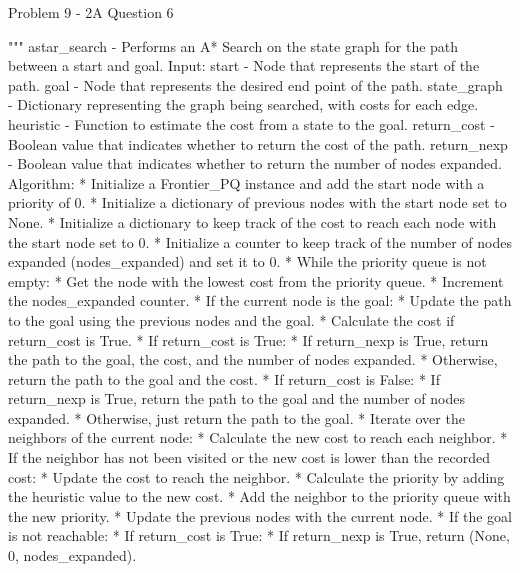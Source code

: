 \begin{problem}{Problem 9 - 2A Question 6}
\begin{highlight}[Solution]
\begin{code}[Python]
    """ astar_search - Performs an A* Search on the state graph for the path between a start and goal.
        Input:
            start - Node that represents the start of the path.
            goal - Node that represents the desired end point of the path.
            state_graph - Dictionary representing the graph being searched, with costs for each edge.
            heuristic - Function to estimate the cost from a state to the goal.
            return_cost - Boolean value that indicates whether to return the cost of the path.
            return_nexp - Boolean value that indicates whether to return the number of nodes expanded.
        Algorithm:
            * Initialize a Frontier_PQ instance and add the start node with a priority of 0.
            * Initialize a dictionary of previous nodes with the start node set to None.
            * Initialize a dictionary to keep track of the cost to reach each node with the start node set to 0.
            * Initialize a counter to keep track of the number of nodes expanded (nodes_expanded) and set it to 0.
            * While the priority queue is not empty:
                * Get the node with the lowest cost from the priority queue.
                * Increment the nodes_expanded counter.
                * If the current node is the goal:
                    * Update the path to the goal using the previous nodes and the goal.
                    * Calculate the cost if return_cost is True.
                    * If return_cost is True:
                        * If return_nexp is True, return the path to the goal, the cost, and the number of nodes expanded.
                        * Otherwise, return the path to the goal and the cost.
                    * If return_cost is False:
                        * If return_nexp is True, return the path to the goal and the number of nodes expanded.
                        * Otherwise, just return the path to the goal.
                * Iterate over the neighbors of the current node:
                    * Calculate the new cost to reach each neighbor.
                    * If the neighbor has not been visited or the new cost is lower than the recorded cost:
                        * Update the cost to reach the neighbor.
                        * Calculate the priority by adding the heuristic value to the new cost.
                        * Add the neighbor to the priority queue with the new priority.
                        * Update the previous nodes with the current node.
            * If the goal is not reachable:
                * If return_cost is True:
                    * If return_nexp is True, return (None, 0, nodes_expanded).

\end{code}
\end{highlight}
\end{problem}
